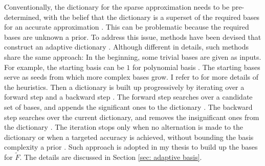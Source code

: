 Conventionally, the dictionary for the sparse approximation needs to
be pre-determined, with the belief that the dictionary is a superset of the required bases
for an accurate approximation \cite{adaptive basis 2}. 
This can be problematic because the required bases are unknown a prior.
To address this issue, methods have been devised that construct an adaptive dictionary
\cite{adaptive basis 1, adaptive basis 2, adaptive basis 3}.
Although different in details, such methods share the same approach: In the beginning, some trivial
bases are given as inputs.
For example, the starting basis can be $1$ for polynomial basis \cite{adaptive basis 1}.
The starting bases serve as seeds from which more complex bases grow. I refer to 
\cite{adaptive basis 1, adaptive basis 2, adaptive basis 3} for more details of the heuristics. 
Then a dictionary is built up progressively 
by iterating over a forward step and a backward step
\cite{adaptive basis 1, adaptive basis 2, adaptive basis 3}.
The forward step searches over a candidate set of bases, and appends the significant ones 
to the dictionary
\cite{adaptive basis 1, adaptive basis 2, adaptive basis 3}.
The backward step searches over the current dictionary, and removes the 
insignificant ones from the dictionary
\cite{adaptive basis 1, adaptive basis 2, adaptive basis 3}.
The iteration stops only when no alternation is made to the dictionary or when a targeted 
accuracy is achieved, without bounding the basis complexity a prior
\cite{adaptive basis 1, adaptive basis 2, adaptive basis 3}.
Such approach is adopted in my thesis to build up 
the bases for $\tilde{F}$. The details are discussed in Section \ref{sec: adaptive basis}.\\





